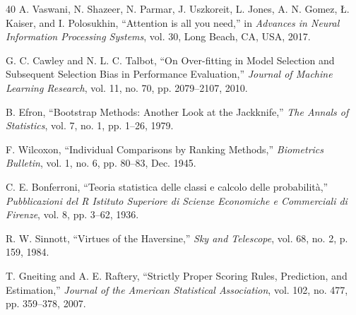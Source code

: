 \documentclass{ametsocv6.1}
\begin{document}
\begin{thebibliography}{40}
A. Vaswani, N. Shazeer, N. Parmar, J. Uszkoreit, L. Jones, A. N. Gomez, \L. Kaiser, and I. Polosukhin, ``Attention is all you need,'' in \textit{Advances in Neural Information Processing Systems}, vol. 30, Long Beach, CA, USA, 2017.

G. C. Cawley and N. L. C. Talbot, ``On Over-fitting in Model Selection and Subsequent Selection Bias in Performance Evaluation,'' \textit{Journal of Machine Learning Research}, vol. 11, no. 70, pp. 2079--2107, 2010.

B. Efron, ``Bootstrap Methods: Another Look at the Jackknife,'' \textit{The Annals of Statistics}, vol. 7, no. 1, pp. 1--26, 1979.

F. Wilcoxon, ``Individual Comparisons by Ranking Methods,'' \textit{Biometrics Bulletin}, vol. 1, no. 6, pp. 80--83, Dec. 1945.

C. E. Bonferroni, ``Teoria statistica delle classi e calcolo delle probabilit\`a,'' \textit{Pubblicazioni del R Istituto Superiore di Scienze Economiche e Commerciali di Firenze}, vol. 8, pp. 3--62, 1936.

R. W. Sinnott, ``Virtues of the Haversine,'' \textit{Sky and Telescope}, vol. 68, no. 2, p. 159, 1984.

T. Gneiting and A. E. Raftery, ``Strictly Proper Scoring Rules, Prediction, and Estimation,'' \textit{Journal of the American Statistical Association}, vol. 102, no. 477, pp. 359--378, 2007.

\end{thebibliography}
\end{document}
